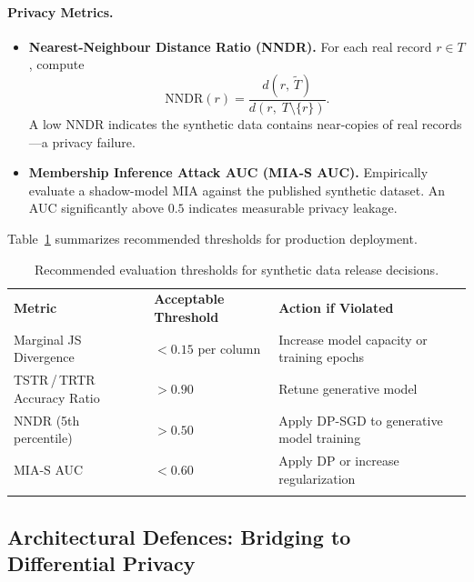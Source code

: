 \paragraph{Privacy Metrics.}
\begin{itemize}
  \item \textbf{Nearest-Neighbour Distance Ratio (NNDR).}
    For each real record $r \in T$, compute
    \begin{equation}
      \mathrm{NNDR}(r)
        = \frac{d(r,\,\tilde{T})}{d(r,\;T \setminus \{r\})}.
    \end{equation}
    A low NNDR indicates the synthetic data contains near-copies of
    real records---a privacy failure.

  \item \textbf{Membership Inference Attack AUC (MIA-S AUC).}
    Empirically evaluate a shadow-model MIA against the published
    synthetic dataset.
    An AUC significantly above $0.5$ indicates measurable privacy
    leakage.
\end{itemize}

Table~\ref{tab:synth-thresholds} summarizes recommended thresholds
for production deployment.

\begin{table}[ht]
\centering
\caption{Recommended evaluation thresholds for synthetic data
         release decisions.}
\label{tab:synth-thresholds}
\begin{tabular}{p{4cm}p{3.5cm}p{4.5cm}}
\hline\noalign{\smallskip}
\textbf{Metric} &
\textbf{Acceptable Threshold} &
\textbf{Action if Violated} \\
\noalign{\smallskip}\svhline\noalign{\smallskip}
Marginal JS Divergence
  & $<\!0.15$ per column
  & Increase model capacity or training epochs \\[4pt]
TSTR\,/\,TRTR Accuracy Ratio
  & $>\!0.90$
  & Retune generative model \\[4pt]
NNDR (5th percentile)
  & $>\!0.50$
  & Apply DP-SGD to generative model training \\[4pt]
MIA-S AUC
  & $<\!0.60$
  & Apply DP or increase regularization \\
\noalign{\smallskip}\hline\noalign{\smallskip}
\end{tabular}
\end{table}

\subsection{Architectural Defences: Bridging to Differential
            Privacy}
\label{subsec:synth-dp-bridge}

